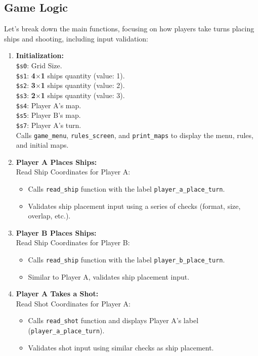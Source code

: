 \subsection{Game Logic}
\qquad Let's break down the main functions, focusing on how players take turns placing ships and shooting, including input validation:

\begin{enumerate}
    \item \textbf{Initialization:} \\[6pt]
    \texttt{\$s0}: Grid Size. \\
    \texttt{\$s1}: \textbf{4$\times$1} ships quantity (value: 1). \\
    \texttt{\$s2}: \textbf{3$\times$1} ships quantity (value: 2). \\
    \texttt{\$s3}: \textbf{2$\times$1} ships quantity (value: 3). \\
    \texttt{\$s4}: Player A's map. \\
    \texttt{\$s5}: Player B's map. \\
    \texttt{\$s7}: Player A's turn. \\

    Calls \texttt{game\_menu},  \texttt{rules\_screen}, and  \texttt{print\_maps} to display the menu, rules, and initial maps.

    \item \textbf{Player A Places Ships:} \\[6pt]
    Read Ship Coordinates for Player A:
    \begin{itemize}
        \item Calls \texttt{read\_ship} function with the label \texttt{player\_a\_place\_turn}.
        \item Validates ship placement input using a series of checks (format, size, overlap, etc.).
    \end{itemize}

    \item \textbf{Player B Places Ships:} \\[6pt]
    Read Ship Coordinates for Player B:
    \begin{itemize}
        \item Calls \texttt{read\_ship} function with the label 
        \texttt{player\_b\_place\_turn}.
        \item Similar to Player A, validates ship placement input.
    \end{itemize}

    \item \textbf{Player A Takes a Shot:} \\[6pt]
    Read Shot Coordinates for Player A:
    \begin{itemize}
        \item Calls \texttt{read\_shot} function and displays Player A's label (\texttt{player\_a\_place\_turn}).
        \item Validates shot input using similar checks as ship placement.
    \end{itemize}


\end{enumerate}

